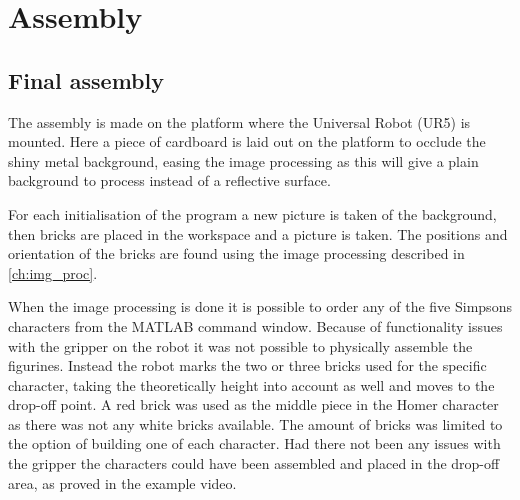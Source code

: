 \chapter{Assembly}


\section{Final assembly}
%
%

The assembly is made on the platform where the Universal Robot (UR5) is mounted. Here a piece of cardboard is laid out on the platform to occlude the shiny metal background, easing the image processing as this will give a plain background to process instead of a reflective surface.

For each initialisation of the program a new picture is taken of the background, then bricks are placed in the workspace and a picture is taken. The positions and orientation of the bricks are found using the image processing described in \autoref{ch:img_proc}.

When the image processing is done it is possible to order any of the five Simpsons characters from the MATLAB command window. Because of functionality issues with the gripper on the robot it was not possible to physically assemble the figurines. Instead the robot marks the two or three bricks used for the specific character, taking the theoretically height into account as well and moves to the drop-off point. A red brick was used as the middle piece in the Homer character as there was not any white bricks available. The amount of bricks was limited to the option of building one of each character. Had there not been any issues with the gripper the characters could have been assembled and placed in the drop-off area, as proved in the example video.

